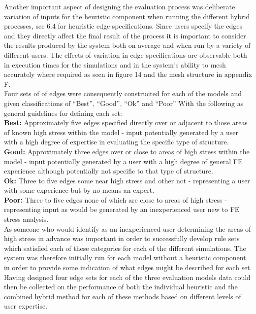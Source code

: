 \noindent
Another important aspect of designing the evaluation process was deliberate variation of inputs for the heuristic component when running the different hybrid processes, see 6.4 for heuristic edge specifications. Since users specify the edges and they directly affect the final result of the process it is important to consider the results produced by the system both on average and when run by a variety of different users. The effects of variation in edge specifications are observable both in execution times for the simulations and in the system's ability to mesh accurately where required as seen in figure 14 and the mesh structure in appendix F. \\ 

\noindent
Four sets of of edges were consequently constructed for each of the models and given classifications of ``Best'', ``Good'', ``Ok'' and ``Poor'' With the following as general guidelines for defining each set: \\

\noindent
\textbf{Best: } Approximately five edges specified directly over or adjacent to those areas of known high stress within the model - input potentially generated by a user with a high degree of expertise in evaluating the specific type of structure. \\ 

\noindent
\textbf{Good: } Approximately three edges over or close to areas of high stress within the model - input potentially generated by a user with a high degree of general FE experience although potentially not specific to that type of structure. \\ 

\noindent
\textbf{Ok: } Three to five edges some near high stress and other not - representing a user with some experience but by no means an expert. \\ 

\noindent
\textbf{Poor: } Three to five edges none of which are close to areas of high stress - representing input as would be generated by an inexperienced user new to FE stress analysis. \\ 

\noindent
As someone who would identify as an inexperienced user determining the areas of high stress in advance was important in order to successfully develop rule sets which satisfied each of these categories  for each of the different simulations. The system was therefore initially run for each model without a heuristic component in order to provide some indication of what edges might be described for each set. Having designed four edge sets for each of the three evaluation models data could then be collected on the performance of both the individual heuristic and the combined hybrid method for each of these methods based on different levels of user expertise. \\


